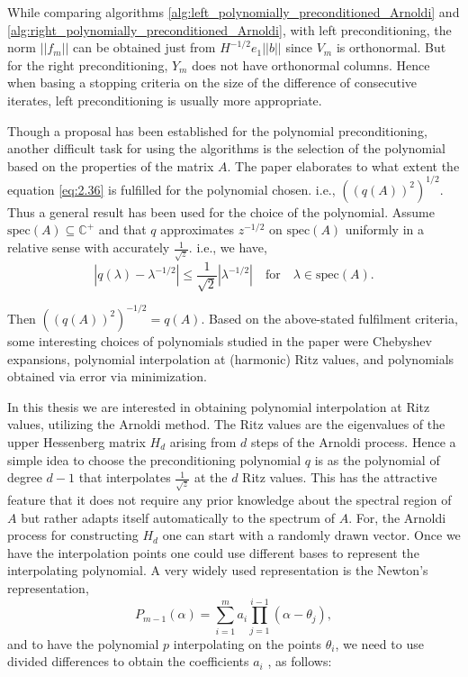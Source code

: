 While comparing algorithms \ref{alg:left_polynomially_preconditioned_Arnoldi} and \ref{alg:right_polynomially_preconditioned_Arnoldi}, with left preconditioning, the norm $||f_{m}||$ can be obtained just from $H^{-1/2}e_{1}||b||$ since $V_{m}$ is orthonormal. But for the right preconditioning, $Y_{m}$ does not have orthonormal columns. Hence when basing a stopping criteria on the size of the difference of consecutive iterates, left preconditioning is usually more appropriate.

Though a proposal has been established for the polynomial preconditioning, another difficult task for using the algorithms is the selection of the polynomial based on the properties of the matrix $A$. The paper \cite{49} elaborates to what extent the equation \eqref{eq:2.36} is fulfilled for the polynomial chosen. i.e., $((q(A))^{2})^{1/2}$. Thus a general result has been used for the choice of the polynomial. Assume $\text{spec}(A) \subseteq \mathbb{C}^{+}$ and that $q$ approximates $z^{-1/2}$ on $\text{spec}(A)$ uniformly in a relative sense with accurately $\frac{1}{\sqrt{z}}$. i.e., we have,
\[
    |q(\lambda) - \lambda^{-1/2}| \leq \frac{1}{\sqrt{2}} |\lambda^{-1/2}| \quad \text{for} \quad \lambda \in \text{spec}(A).
\]

Then $((q(A))^{2})^{-1/2} = q(A)$. Based on the above-stated fulfilment criteria, some interesting choices of polynomials studied in the paper were Chebyshev expansions, polynomial interpolation at (harmonic) Ritz values,  and polynomials obtained via error via minimization.

In this thesis we are interested in obtaining polynomial interpolation at Ritz values, utilizing the Arnoldi method. The Ritz values are the eigenvalues of the upper Hessenberg matrix $H_{d}$ arising from $d$ steps of the Arnoldi process. Hence a simple idea to choose the preconditioning polynomial $q$ is as the polynomial of degree $d - 1$ that interpolates $\frac{1}{\sqrt{z}}$ at the $d$ Ritz values. This has the attractive feature that it does not require any prior knowledge about the spectral region of $A$ but rather adapts itself automatically to the spectrum of $A$. For, the Arnoldi process for constructing $H_{d}$ one can start with a randomly drawn vector. Once we have the interpolation points one could use different bases to represent the interpolating polynomial. A very widely used representation is the Newton's representation,
\begin{equation}
    P_{m-1}(\alpha) = \sum_{i=1}^{m} a_i \prod_{j=1}^{i-1} (\alpha - \theta_j),
    \label{eq:2.37}
\end{equation}
and to have the polynomial $p$ interpolating on the points ${\theta_{i} }$, we need to use divided differences to obtain the coefficients $a_{i}$ , as follows:

